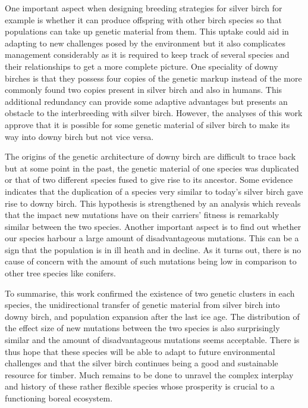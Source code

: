 \documentclass[10pt]{article}
\begin{document}
One important aspect when designing breeding strategies for silver birch for example is whether it can produce offspring with other birch species so that populations can take up genetic material from them. This uptake could aid in adapting to new challenges posed by the environment but it also complicates management considerably as it is required to keep track of several species and their relationships to get a more complete picture. One speciality of downy birches is that they possess four copies of the genetic markup instead of the more commonly found two copies present in silver birch and also in humans. This additional redundancy can provide some adaptive advantages but presents an obstacle to the interbreeding with silver birch. However, the analyses of this work approve that it is possible for some genetic material of silver birch to make its way into downy birch but not vice versa.

The origins of the genetic architecture of downy birch are difficult to trace back but at some point in the past, the genetic material of one species was duplicated or that of two different species fused to give rise to its ancestor. Some evidence indicates that the duplication of a species very similar to today's silver birch gave rise to downy birch. This hypothesis is strengthened by an analysis which reveals that the impact new mutations have on their carriers' fitness is remarkably similar between the two species. Another important aspect is to find out whether our species harbour a large amount of disadvantageous mutations. This can be a sign that the population is in ill heath and in decline. As it turns out, there is no cause of concern with the amount of such mutations being low in comparison to other tree species like conifers.

To summarise, this work confirmed the existence of two genetic clusters in each species, the unidirectional transfer of genetic material from silver birch into downy birch, and population expansion after the last ice age. The distribution of the effect size of new mutations between the two species is also surprisingly similar and the amount of disadvantageous mutations seems acceptable. There is thus hope that these species will be able to adapt to future environmental challenges and that the silver birch continues being a good and sustainable resource for timber. Much remains to be done to unravel the complex interplay and history of these rather flexible species whose prosperity is crucial to a functioning boreal ecosystem.
\end{document}
